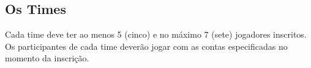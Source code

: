 \subsection{Os Times}

Cada time deve ter ao menos 5 (cinco) e no máximo 7 (sete) jogadores inscritos. Os participantes de cada time deverão jogar com as contas especificadas no momento da inscrição.
